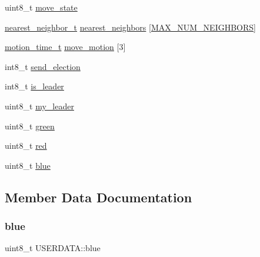 \begin{DoxyCompactItemize}
uint8\+\_\+t \hyperlink{struct_u_s_e_r_d_a_t_a_a7a804c64ea1fbe6dc1342c53f1c8ebbb}{move\+\_\+state}
\item 
\hyperlink{structnearest__neighbor__t}{nearest\+\_\+neighbor\+\_\+t} \hyperlink{struct_u_s_e_r_d_a_t_a_a832531c1f98fb79baf05dc6c9b5e40db}{nearest\+\_\+neighbors} \mbox{[}\hyperlink{ring_8h_a7f85654336ae45adee0001ba8cdb8851}{M\+A\+X\+\_\+\+N\+U\+M\+\_\+\+N\+E\+I\+G\+H\+B\+O\+RS}\mbox{]}
\item 
\hyperlink{structmotion__time__t}{motion\+\_\+time\+\_\+t} \hyperlink{struct_u_s_e_r_d_a_t_a_a7e5fcf447d94ea3ee0374dec1af33ced}{move\+\_\+motion} \mbox{[}3\mbox{]}
\item 
int8\+\_\+t \hyperlink{struct_u_s_e_r_d_a_t_a_a4810020dbab38cc0516951ed762b5028}{send\+\_\+election}
\item 
int8\+\_\+t \hyperlink{struct_u_s_e_r_d_a_t_a_abe929e6fb03957843bcb3a8b4030f63a}{is\+\_\+leader}
\item 
uint8\+\_\+t \hyperlink{struct_u_s_e_r_d_a_t_a_aaf8c14d5d2871bbf4ae1293210e8769d}{my\+\_\+leader}
\item 
uint8\+\_\+t \hyperlink{struct_u_s_e_r_d_a_t_a_a25eeb02dc0734abc99a841f18ffddc28}{green}
\item 
uint8\+\_\+t \hyperlink{struct_u_s_e_r_d_a_t_a_a489b2c5c4ef2024d3b9b1972850facee}{red}
\item 
uint8\+\_\+t \hyperlink{struct_u_s_e_r_d_a_t_a_aa5fb7ae10345095126fa610507cddb0c}{blue}
\end{DoxyCompactItemize}


\subsection{Member Data Documentation}
\mbox{\label{struct_u_s_e_r_d_a_t_a_aa5fb7ae10345095126fa610507cddb0c}} 
\subsubsection{\texorpdfstring{blue}{blue}}
{\footnotesize\ttfamily uint8\+\_\+t U\+S\+E\+R\+D\+A\+T\+A\+::blue}

\mbox{\label{struct_u_s_e_r_d_a_t_a_a776accb60751dfaaef71a780aa26565e}} 
